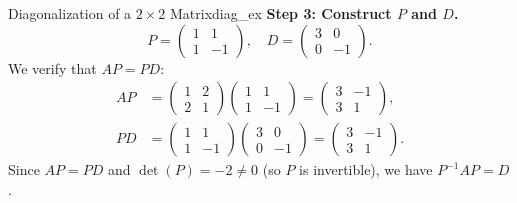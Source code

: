 \begin{example}{Diagonalization of a $2 \times 2$ Matrix}{diag_ex}
    \textbf{Step 3: Construct $P$ and $D$.}
    \begin{equation*}
        P = \begin{pmatrix} 1 & 1 \\ 1 & -1 \end{pmatrix}, \quad D = \begin{pmatrix} 3 & 0 \\ 0 & -1 \end{pmatrix}.
    \end{equation*}
    We verify that $AP = PD$:
    \begin{align*}
        AP &= \begin{pmatrix} 1 & 2 \\ 2 & 1 \end{pmatrix}\begin{pmatrix} 1 & 1 \\ 1 & -1 \end{pmatrix} = \begin{pmatrix} 3 & -1 \\ 3 & 1 \end{pmatrix}, \\
        PD &= \begin{pmatrix} 1 & 1 \\ 1 & -1 \end{pmatrix}\begin{pmatrix} 3 & 0 \\ 0 & -1 \end{pmatrix} = \begin{pmatrix} 3 & -1 \\ 3 & 1 \end{pmatrix}.
    \end{align*}
    Since $AP = PD$ and $\det(P) = -2 \neq 0$ (so $P$ is invertible), we have $P^{-1} A P = D$.
\end{example}

